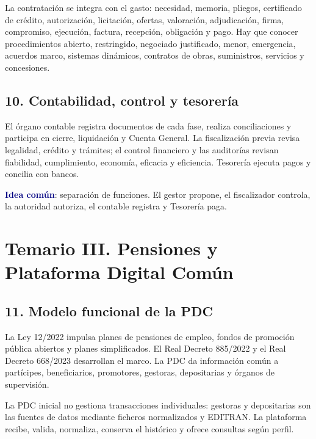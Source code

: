 \documentclass[11pt,a4paper]{article}
\newcommand{\key}[1]{\textbf{\textcolor{navy}{#1}}}
\begin{document}
La contratación se integra con el gasto: necesidad, memoria, pliegos, certificado de crédito, autorización, licitación, ofertas, valoración, adjudicación, firma, compromiso, ejecución, factura, recepción, obligación y pago. Hay que conocer procedimientos abierto, restringido, negociado justificado, menor, emergencia, acuerdos marco, sistemas dinámicos, contratos de obras, suministros, servicios y concesiones.

\subsection{10. Contabilidad, control y tesorería}

El órgano contable registra documentos de cada fase, realiza conciliaciones y participa en cierre, liquidación y Cuenta General. La fiscalización previa revisa legalidad, crédito y trámites; el control financiero y las auditorías revisan fiabilidad, cumplimiento, economía, eficacia y eficiencia. Tesorería ejecuta pagos y concilia con bancos.

\key{Idea común}: separación de funciones. El gestor propone, el fiscalizador controla, la autoridad autoriza, el contable registra y Tesorería paga.

\section{Temario III. Pensiones y Plataforma Digital Común}

\subsection{11. Modelo funcional de la PDC}

La Ley 12/2022 impulsa planes de pensiones de empleo, fondos de promoción pública abiertos y planes simplificados. El Real Decreto 885/2022 y el Real Decreto 668/2023 desarrollan el marco. La PDC da información común a partícipes, beneficiarios, promotores, gestoras, depositarias y órganos de supervisión.

La PDC inicial no gestiona transacciones individuales: gestoras y depositarias son las fuentes de datos mediante ficheros normalizados y EDITRAN. La plataforma recibe, valida, normaliza, conserva el histórico y ofrece consultas según perfil.
\end{document}
